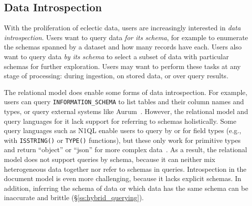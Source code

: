 
\vspace{-1em}

\subsection{Data Introspection} \label{ss:hybrid_schema}

With the proliferation of eclectic data, users are increasingly interested in {\em data introspection}. Users want to query data {\em for its schema}, for example to enumerate the schemas spanned by a dataset and how many records have each. Users also want to query data {\em by its schema} to select a subset of data with particular schemas for further exploration. 
Users may want to perform these tasks at any stage of processing: during ingestion, on stored data, or over query results.

The relational model does enable some forms of data introspection. For example, users can query \texttt{INFORMATION\_SCHEMA} to list tables and their column names and types, or query external systems like Aurum~\cite{aurum}.
However, the relational model and query languages for it lack support for referring to schemas holistically. Some query languages such as N1QL enable users to query by or for field types (e.g., with \texttt{ISSTRING()} or \texttt{TYPE()} functions), but these only work for primitive types and return ``object'' or ``json'' for more complex data~\cite{sqlite, n1ql, mongo}. As a result, the relational model does not support queries by schema, because it can neither mix heterogeneous data together nor refer to schemas in queries. Introspection in the document model is even more challenging, because it lacks explicit schemas. In addition, inferring the schema of data or which data has the same schema can be inaccurate and brittle (\S\ref{ss:hybrid_querying}).

